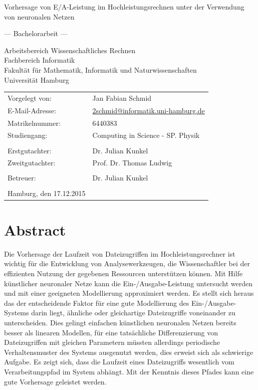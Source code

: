 \documentclass[
	12pt,
	a4paper,
	BCOR10mm,
	DIV14,
	listof=totoc,
	bibliography=totoc,
	headsepline
]{scrreprt}
\begin{document}
\begin{titlepage}
	\begin{center}
		{\titlefont\huge Vorhersage von E/A-Leistung im Hochleistungsrechnen unter der Verwendung von neuronalen Netzen\par}

		\bigskip
		\bigskip

		{\titlefont\Large --- Bachelorarbeit ---\par}

		\bigskip
		\bigskip

		{\large Arbeitsbereich Wissenschaftliches Rechnen\\
		Fachbereich Informatik\\
		Fakultät für Mathematik, Informatik und Naturwissenschaften\\
		Universität Hamburg\par}
	\end{center}

	\vfill

	{\large \begin{tabular}{ll}
		Vorgelegt von: & Jan Fabian Schmid \\
		E-Mail-Adresse: & \href{mailto:2schmid@informatik.uni-hamburg.de}{2schmid@informatik.uni-hamburg.de} \\
		Matrikelnummer: & 6440383 \\
		Studiengang: & Computing in Science - SP. Physik \\
		\\
		Erstgutachter: & Dr. Julian Kunkel \\
		Zweitgutachter: & Prof. Dr. Thomas Ludwig\\ \\
		Betreuer: & Dr. Julian Kunkel \\
		\\
		Hamburg, den 17.12.2015
	\end{tabular}\par}
\end{titlepage}

\chapter*{Abstract}
Die Vorhersage der Laufzeit von Dateizugriffen im Hochleistungsrechner ist wichtig für die Entwicklung von Analysewerkzeugen, die Wissenschaftler bei der effizienten Nutzung der gegebenen Ressourcen unterstützen können.
Mit Hilfe künstlicher neuronaler Netze kann die Ein-/Ausgabe-Leistung untersucht werden und mit einer geeigneten Modellierung approximiert werden.
Es stellt sich heraus das der entscheidende Faktor für eine gute Modellierung des Ein-/Ausgabe-Systems darin liegt, ähnliche oder gleichartige Dateizugriffe voneinander zu unterscheiden.
Dies gelingt einfachen künstlichen neuronalen Netzen bereits besser als linearen Modellen, für eine tatsächliche Differenzierung von Dateizugriffen mit gleichen Parametern müssten allerdings periodische Verhaltensmuster des Systems ausgenutzt werden, dies erweist sich als schwierige Aufgabe.
Es zeigt sich, dass die Laufzeit eines Dateizugriffs wesentlich vom Verarbeitungspfad im System abhängt. Mit der Kenntnis dieses Pfades kann eine gute Vorhersage geleistet werden.
\end{document}
